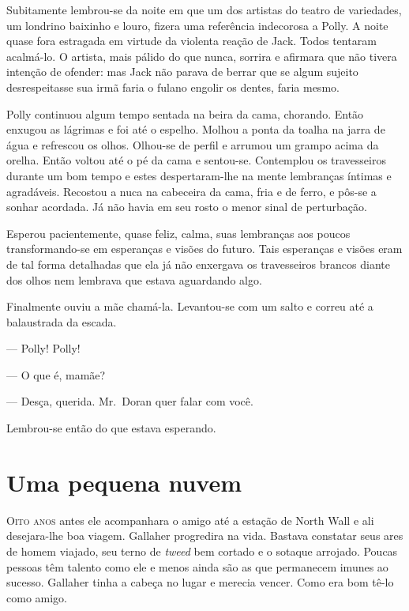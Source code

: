 Subitamente lembrou-se da noite em que um dos artistas do teatro de variedades,
um londrino baixinho e louro, fizera uma referência indecorosa a Polly.  A
noite quase fora estragada em virtude da violenta reação de Jack.  Todos
tentaram acalmá-lo.  O artista, mais pálido do que nunca, sorrira e afirmara
que não tivera intenção de ofender: mas Jack não parava de berrar que se algum
sujeito desrespeitasse sua irmã faria o fulano engolir os dentes, faria mesmo.

\smallskip

\noindent\dotfill

\smallskip

Polly continuou algum tempo sentada na beira da cama, chorando.  Então enxugou
as lágrimas e foi até o espelho.  Molhou a ponta da toalha na jarra de água e
refrescou os olhos.  Olhou-se de perfil e arrumou um grampo acima da orelha.
Então voltou até o pé da cama e sentou-se.  Contemplou os travesseiros durante
um bom tempo e estes despertaram-lhe na mente lembranças íntimas e agradáveis.
Recostou a nuca na cabeceira da cama, fria e de ferro, e pôs-se a sonhar
acordada.  Já não havia em seu rosto o menor sinal de perturbação.

Esperou pacientemente, quase feliz, calma, suas lembranças aos poucos
transformando-se em esperanças e visões do futuro.  Tais esperanças e visões
eram de tal forma detalhadas que ela já não enxergava os travesseiros brancos
diante dos olhos nem lembrava que estava aguardando algo.

Finalmente ouviu a mãe chamá-la.  Levantou-se com um salto e correu até a
balaustrada da escada.

--- Polly! Polly!

--- O que é, mamãe?

--- Desça, querida.  Mr.~Doran quer falar com você.

Lembrou-se então do que estava esperando.


\chapter{Uma pequena nuvem}

\textsc{Oito anos} antes ele acompanhara o amigo até a estação de North Wall e
ali desejara-lhe boa viagem.  Gallaher progredira na vida.  Bastava constatar
seus ares de homem viajado, seu terno de \textit{tweed} bem cortado e o sotaque
arrojado.  Poucas pessoas têm talento como ele e menos ainda são as que
permanecem imunes ao sucesso.  Gallaher tinha a cabeça no lugar e merecia
vencer.  Como era bom tê-lo como amigo.

